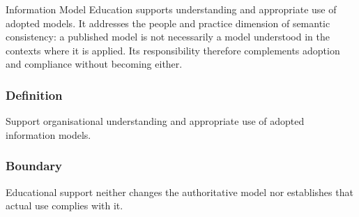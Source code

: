 Information Model Education supports understanding and appropriate use of adopted models. It addresses the people and practice dimension of semantic consistency: a published model is not necessarily a model understood in the contexts where it is applied. Its responsibility therefore complements adoption and compliance without becoming either.

\subsubsection*{Definition}

Support organisational understanding and appropriate use of adopted information models.

\subsubsection*{Boundary}

Educational support neither changes the authoritative model nor establishes that actual use complies with it.

